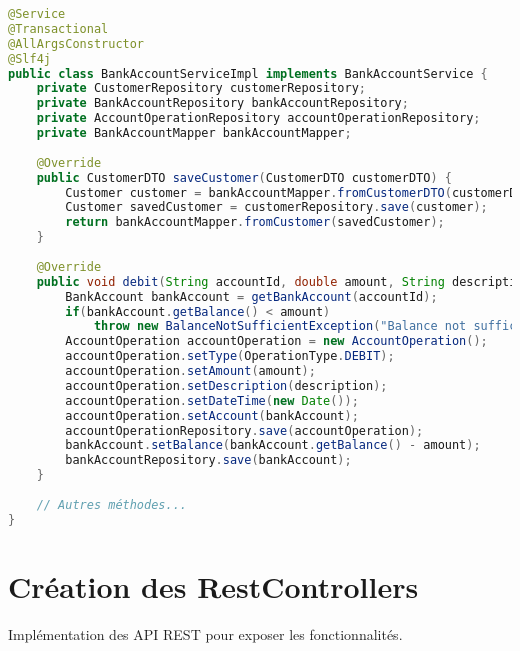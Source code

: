 \documentclass[12pt,a4paper]{report}
\begin{document}
\begin{lstlisting}[language=Java, caption=BankAccountServiceImpl.java]
@Service
@Transactional
@AllArgsConstructor
@Slf4j
public class BankAccountServiceImpl implements BankAccountService {
    private CustomerRepository customerRepository;
    private BankAccountRepository bankAccountRepository;
    private AccountOperationRepository accountOperationRepository;
    private BankAccountMapper bankAccountMapper;
    
    @Override
    public CustomerDTO saveCustomer(CustomerDTO customerDTO) {
        Customer customer = bankAccountMapper.fromCustomerDTO(customerDTO);
        Customer savedCustomer = customerRepository.save(customer);
        return bankAccountMapper.fromCustomer(savedCustomer);
    }
    
    @Override
    public void debit(String accountId, double amount, String description) {
        BankAccount bankAccount = getBankAccount(accountId);
        if(bankAccount.getBalance() < amount)
            throw new BalanceNotSufficientException("Balance not sufficient");
        AccountOperation accountOperation = new AccountOperation();
        accountOperation.setType(OperationType.DEBIT);
        accountOperation.setAmount(amount);
        accountOperation.setDescription(description);
        accountOperation.setDateTime(new Date());
        accountOperation.setAccount(bankAccount);
        accountOperationRepository.save(accountOperation);
        bankAccount.setBalance(bankAccount.getBalance() - amount);
        bankAccountRepository.save(bankAccount);
    }
    
    // Autres méthodes...
}
\end{lstlisting}

\section{Création des RestControllers}
Implémentation des API REST pour exposer les fonctionnalités.
\end{document}
